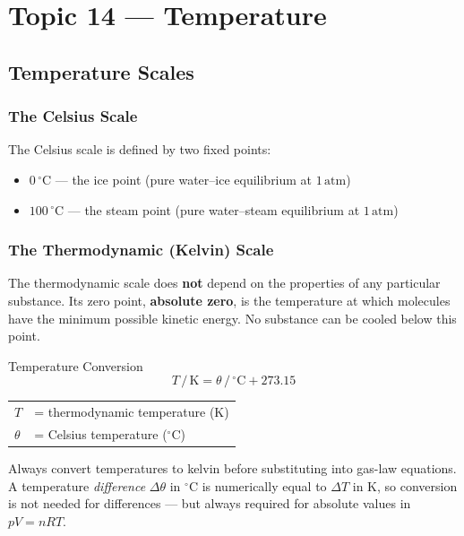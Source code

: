 \section{Topic 14 — Temperature}

\subsection{Temperature Scales}

\subsubsection{The Celsius Scale}
The Celsius scale is defined by two fixed points:
\begin{itemize}
  \item $0\,{}^{\circ}\text{C}$ — the ice point (pure water–ice equilibrium at $1\,\text{atm}$)
  \item $100\,{}^{\circ}\text{C}$ — the steam point (pure water–steam equilibrium at $1\,\text{atm}$)
\end{itemize}

\subsubsection{The Thermodynamic (Kelvin) Scale}
The thermodynamic scale does \textbf{not} depend on the properties of any particular
substance. Its zero point, \textbf{absolute zero}, is the temperature at which molecules
have the minimum possible kinetic energy. No substance can be cooled below this point.

\begin{formulabox}{Temperature Conversion}
\begin{equation}
  T\,/\,\mathrm{K} = \theta\,/\,{}^{\circ}\mathrm{C} + 273.15
\end{equation}
\begin{tabular}{ll}
$T$ & = thermodynamic temperature (K) \\
$\theta$ & = Celsius temperature (${}^{\circ}$C)
\end{tabular}
\end{formulabox}

\begin{tipbox}
Always convert temperatures to kelvin before substituting into gas-law equations.
A temperature \emph{difference} $\Delta\theta$ in ${}^{\circ}$C is numerically equal to
$\Delta T$ in K, so conversion is not needed for differences — but always required for
absolute values in $pV = nRT$.
\end{tipbox}

